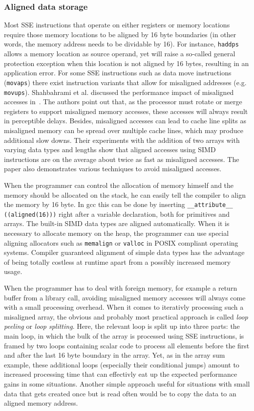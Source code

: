 \subsubsection{Aligned data storage} 
Most SSE instructions that operate on either registers or memory locations require those memory locations to be aligned by 16 byte boundaries (in other words, the memory address needs to be dividable by 16). For instance, \texttt{haddps} allows a memory location as source operand, yet will raise a so-called general protection exception when this location is not aligned by 16 bytes, resulting in an application error. For some SSE instructions such as data move instructions (\texttt{movaps}) there exist instruction variants that allow for misaligned addresses (e.g. \texttt{movups}). Shahbahrami et al. discussed the performance impact of misaligned accesses in~\cite{shahbahrami2006}. The authors point out that, as the processor must rotate or merge registers to support misaligned memory accesses, these accesses will always result in perceptible delays. Besides, misaligned accesses can lead to cache line splits as misaligned memory can be spread over multiple cache lines, which may produce additional slow downs. Their experiments with the addition of two arrays with varying data types and lengths show that aligned accesses using SIMD instructions are on the average about twice as fast as misaligned accesses. The paper also demonstrates various techniques to avoid misaligned accesses.

When the programmer can control the allocation of memory himself and the memory should be allocated on the stack, he can easily tell the compiler to align the memory by 16 byte. In gcc this can be done by inserting \texttt{\_\_attribute\_\_ ((aligned(16)))} right after a variable declaration, both for primitives and arrays. The built-in SIMD data types are aligned automatically. When it is necessary to allocate memory on the heap, the programmer can use special aligning allocators such as \texttt{memalign} or \texttt{valloc} in POSIX compliant operating systems. Compiler guaranteed alignment of simple data types has the advantage of being totally costless at runtime apart from a possibly increased memory usage. 

When the programmer has to deal with foreign memory, for example a return buffer from a library call, avoiding misaligned memory accesses will always come with a small processing overhead. When it comes to iterativly processing such a misaligned array, the obvious and probably most practical approach is called \emph{loop peeling} or \emph{loop splitting}. Here, the relevant loop is split up into three parts: the main loop, in which the bulk of the array is processed using SSE instructions, is framed by two loops containing scalar code to process all elements before the first and after the last 16 byte boundary in the array. Yet, as in the array sum example, these additional loops (especially their conditional jumps) amount to increased processing time that can effectivly eat up the expected performance gains in some situations. Another simple approach useful for situations with small data that gets created once but is read often would be to copy the data to an aligned memory address.

